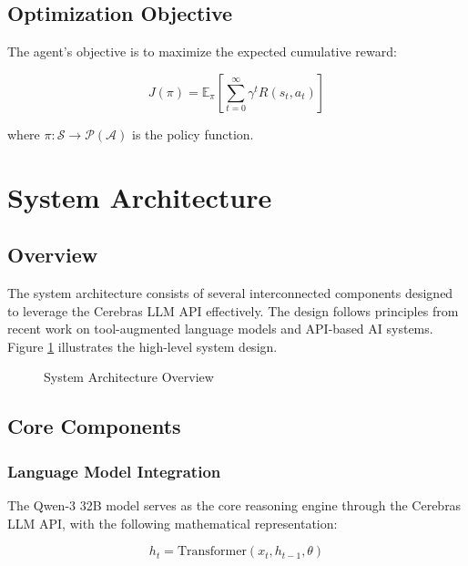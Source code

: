 \documentclass[11pt,a4paper]{article}
\begin{document}
\subsection{Optimization Objective}

The agent's objective is to maximize the expected cumulative reward:

\begin{equation}
J(\pi) = \mathbb{E}_{\pi} \left[ \sum_{t=0}^{\infty} \gamma^t R(s_t, a_t) \right]
\end{equation}

where $\pi: \mathcal{S} \rightarrow \mathcal{P}(\mathcal{A})$ is the policy function.

\section{System Architecture}

\subsection{Overview}

The system architecture consists of several interconnected components designed to leverage the Cerebras LLM API effectively. The design follows principles from recent work on tool-augmented language models \cite{li2022competition, roziere2023code} and API-based AI systems. Figure \ref{fig:architecture} illustrates the high-level system design.

\begin{figure}[H]
\centering

\caption{System Architecture Overview}
\label{fig:architecture}
\end{figure}

\subsection{Core Components}

\subsubsection{Language Model Integration}

The Qwen-3 32B model \cite{liu2023qwen} serves as the core reasoning engine through the Cerebras LLM API, with the following mathematical representation:

\begin{equation}
h_t = \text{Transformer}(x_t, h_{t-1}, \theta)
\end{equation}
\end{document}
